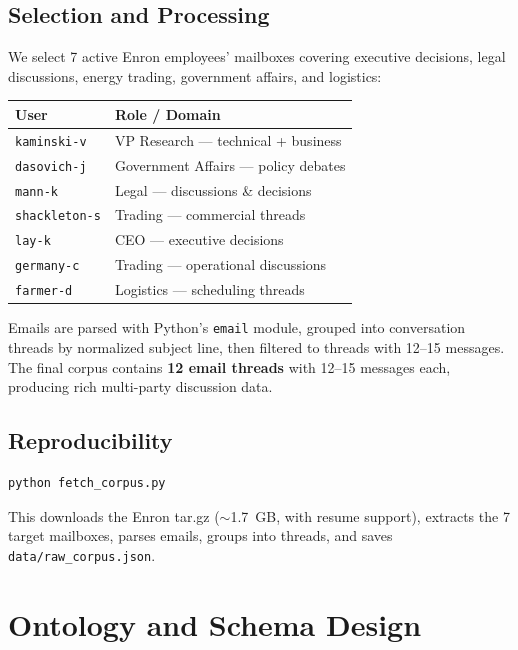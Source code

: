 \documentclass[11pt,a4paper]{article}
\begin{document}
\subsection{Selection and Processing}
We select 7 active Enron employees' mailboxes covering executive decisions, legal discussions, energy trading, government affairs, and logistics:

\begin{center}
\begin{tabular}{ll}
\toprule
\textbf{User} & \textbf{Role / Domain} \\
\midrule
\texttt{kaminski-v} & VP Research --- technical + business \\
\texttt{dasovich-j} & Government Affairs --- policy debates \\
\texttt{mann-k} & Legal --- discussions \& decisions \\
\texttt{shackleton-s} & Trading --- commercial threads \\
\texttt{lay-k} & CEO --- executive decisions \\
\texttt{germany-c} & Trading --- operational discussions \\
\texttt{farmer-d} & Logistics --- scheduling threads \\
\bottomrule
\end{tabular}
\end{center}

Emails are parsed with Python's \texttt{email} module, grouped into conversation threads by normalized subject line, then filtered to threads with 12--15 messages. The final corpus contains \textbf{12 email threads} with 12--15 messages each, producing rich multi-party discussion data.

\subsection{Reproducibility}
\begin{lstlisting}[language=bash]
python fetch_corpus.py
\end{lstlisting}
This downloads the Enron tar.gz ($\sim$1.7~GB, with resume support), extracts the 7 target mailboxes, parses emails, groups into threads, and saves \texttt{data/raw\_corpus.json}.

\section{Ontology and Schema Design}
\end{document}
